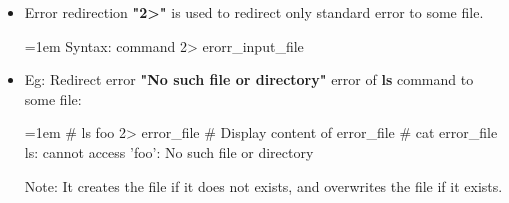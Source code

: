 \setlength{\columnsep}{3pt}
\begin{flushleft}
	\begin{itemize}
		\item Error redirection \textbf{"2>"} is used to redirect only standard error to some file.	
		\bigskip
		\begin{tcolorbox}[breakable,notitle,boxrule=-0pt,colback=pink,colframe=pink]
			\color{black}
			\font=1em
			Syntax: command 2> erorr\_input\_file
			\font=4pt
		\end{tcolorbox}
		\item
		Eg: Redirect error \textbf{"No such file or directory"} error of \textbf{ls} command to some file:
		\bigskip
		\begin{tcolorbox}[breakable,notitle,boxrule=-0pt,colback=black,colframe=black]
			\color{green}
			\font=1em
			\# ls foo 2> error\_file
			\newline
			\newline
			\color{yellow}
			\# Display content of error\_file
			\color{green}
			\newline
			\# cat error\_file
			\newline
			\color{white}
			ls: cannot access 'foo': No such file or directory
			\font=4pt
			
			\font=4pt
		\end{tcolorbox}
	\bigskip
		\begin{tcolorbox}[breakable,notitle,boxrule=1pt,colback=yellow,colframe=yellow]
			\color{black}
			Note: It creates the file if it does not exists, and overwrites the file if it exists.
		\end{tcolorbox}
	\end{itemize}
	
	
\end{flushleft}

\newpage
